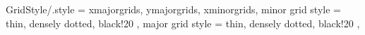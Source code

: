 
\pgfplotsset
{
	GridStyle/.style =
	{
		xmajorgrids,
		ymajorgrids,
		xminorgrids,
		minor grid style =
		{
			thin,
			densely dotted,
			black!20
		},
		major grid style =
		{
			thin,
			densely dotted,
			black!20
		},
	}
}
